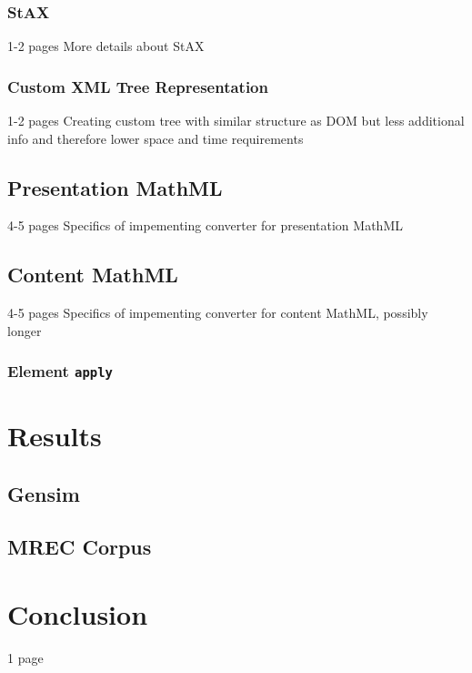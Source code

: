\documentclass[11pt,oneside,final]{fithesis2}
\begin{document}
\subsection{StAX}
1-2 pages More details about StAX
\subsection{Custom XML Tree Representation}
1-2 pages Creating custom tree with similar structure as DOM but less additional info and therefore lower space and time requirements

\section{Presentation MathML}
4-5 pages Specifics of impementing converter for presentation MathML
\section{Content MathML}
4-5 pages Specifics of impementing converter for content MathML, possibly longer
\subsection{Element \texttt{apply}}

\chapter{Results}
\section{Gensim}
\section{MREC Corpus}

\chapter{Conclusion}
1 page



\end{document}
